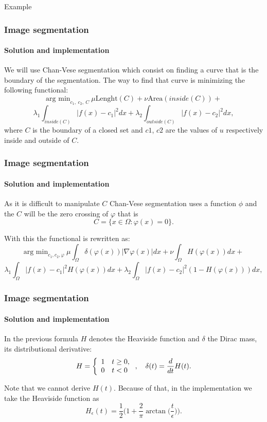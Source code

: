 \documentclass[11pt]{beamer}
\begin{document}
\begin{frame}
\begin{exampleblock}{Example}
\begin{figure}
\begin{subfigure}[b]{0.4\textwidth}
    \end{subfigure}

\end{figure}
\end{exampleblock}
\end{frame}

\begin{frame}
\frametitle{Image segmentation}
\framesubtitle{Solution and implementation}

We will use Chan-Vese segmentation which consist on finding a curve that is the boundary of the segmentation. The way to find that curve is minimizing the following functional:
$$\text{arg min}_{c_1,\ c_2,\ C }\ \mu \text{Lenght}(C) +\nu\text{Area}(inside(C)) +$$$$ \lambda_1\int_{inside(C)}|f(x)-c_1|^2dx + \lambda_2\int_{outside(C)}|f(x)-c_2|^2dx,$$
where $C$ is the boundary of a closed set and $c1$, $c2$ are the values of $u$ respectively inside and outside of $C$. 

\end{frame}

\begin{frame}
\frametitle{Image segmentation}
\framesubtitle{Solution and implementation}
\begin{block}{}
As it is difficult to manipulate $C$ Chan-Vese segmentation uses a function $\phi$ and the $C$ will be the zero crossing of $\varphi$ that is 
$$C = \{x\in \Omega:\varphi(x) = 0\}.$$
\end{block}

With this the functional is rewritten as:
$$\text{arg min}_{c_1, c_2, \varphi}\ \mu \int_{\Omega}\delta(\varphi(x))|\nabla\varphi(x)|dx+\nu \int_{\Omega}H(\varphi(x))dx +$$$$ \lambda_1\int_{\Omega}|f(x)-c_1|^2H(\varphi(x))dx + \lambda_2\int_{\Omega}|f(x) -c_2|^2(1-H(\varphi(x)))dx,$$
\end{frame}

\begin{frame}
\frametitle{Image segmentation}
\framesubtitle{Solution and implementation}
In the previous formula $H$ denotes the Heaviside function and $\delta$ the Dirac mass, its distributional derivative:
$$ H = \left\lbrace\begin{array}{l l}
1&t\geq 0,\\
0 & t<0
\end{array}\right. ,\quad \delta(t) = \frac{d}{dt}H(t).$$

Note that we cannot derive $H(t)$. Because of that, in the implementation we take the Heaviside function as
$$H_{\epsilon}(t) = \frac{1}{2}\bigg(1 + \frac{2}{\pi}\arctan \bigg(\frac{t}{\epsilon}\bigg)\bigg).$$

\end{frame}
\end{document}
